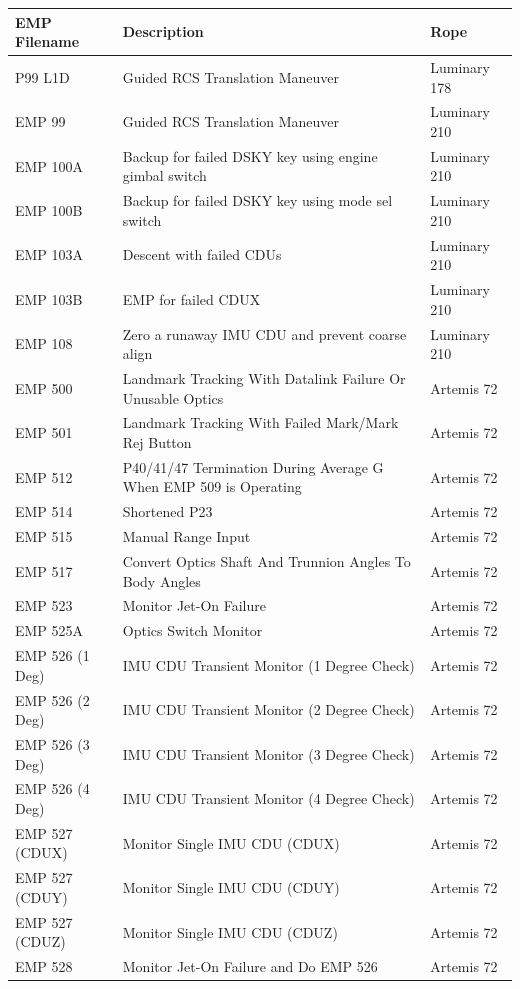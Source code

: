 \documentclass[11pt]{article} %
\begin{document}
\begin{tabular}{|l|L{9cm}|l|}
\hline
\textbf{EMP Filename}&\textbf{Description}&\textbf{Rope}\\
\hline
P99 L1D&Guided RCS Translation Maneuver&Luminary 178\\
\hline
EMP 99&Guided RCS Translation Maneuver&Luminary 210\\
\hline
EMP 100A&Backup for failed DSKY key using engine gimbal switch&Luminary 210\\
\hline
EMP 100B&Backup for failed DSKY key using mode sel switch&Luminary 210\\
\hline
EMP 103A&Descent with failed CDUs&Luminary 210\\
\hline
EMP 103B&EMP for failed CDUX&Luminary 210\\
\hline
EMP 108&Zero a runaway IMU CDU and prevent coarse align&Luminary 210\\
\hline
EMP 500&Landmark Tracking With Datalink Failure Or Unusable Optics&Artemis 72\\
\hline
EMP 501&Landmark Tracking With Failed Mark/Mark Rej Button&Artemis 72\\
\hline
EMP 512&P40/41/47 Termination During Average G When EMP 509 is Operating&Artemis 72\\
\hline
EMP 514&Shortened P23&Artemis 72\\
\hline
EMP 515&Manual Range Input&Artemis 72\\
\hline
EMP 517&Convert Optics Shaft And Trunnion Angles To Body Angles&Artemis 72\\
\hline
EMP 523&Monitor Jet-On Failure&Artemis 72\\
\hline
EMP 525A&Optics Switch Monitor&Artemis 72\\
\hline
EMP 526 (1 Deg)&IMU CDU Transient Monitor (1 Degree Check)&Artemis 72\\
\hline
EMP 526 (2 Deg)&IMU CDU Transient Monitor (2 Degree Check)&Artemis 72\\
\hline
EMP 526 (3 Deg)&IMU CDU Transient Monitor (3 Degree Check)&Artemis 72\\
\hline
EMP 526 (4 Deg)&IMU CDU Transient Monitor (4 Degree Check)&Artemis 72\\
\hline
EMP 527 (CDUX)&Monitor Single IMU CDU (CDUX)&Artemis 72\\
\hline
EMP 527 (CDUY)&Monitor Single IMU CDU (CDUY)&Artemis 72\\
\hline
EMP 527 (CDUZ)&Monitor Single IMU CDU (CDUZ)&Artemis 72\\
\hline
EMP 528&Monitor Jet-On Failure and Do EMP 526&Artemis 72\\

\end{tabular}
\end{document}
